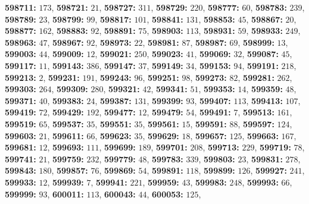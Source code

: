 \textsf{\bfseries 598711:} $173$, \textsf{\bfseries 598721:} $21$, \textsf{\bfseries 598727:} $311$, \textsf{\bfseries 598729:} $220$, \textsf{\bfseries 598777:} $60$, \textsf{\bfseries 598783:} $239$, \textsf{\bfseries 598789:} $23$, \textsf{\bfseries 598799:} $99$, \textsf{\bfseries 598817:} $101$, \textsf{\bfseries 598841:} $131$, \textsf{\bfseries 598853:} $45$, \textsf{\bfseries 598867:} $20$, \textsf{\bfseries 598877:} $162$, \textsf{\bfseries 598883:} $92$, \textsf{\bfseries 598891:} $75$, \textsf{\bfseries 598903:} $113$, \textsf{\bfseries 598931:} $59$, \textsf{\bfseries 598933:} $249$, \textsf{\bfseries 598963:} $47$, \textsf{\bfseries 598967:} $92$, \textsf{\bfseries 598973:} $22$, \textsf{\bfseries 598981:} $87$, \textsf{\bfseries 598987:} $69$, \textsf{\bfseries 598999:} $13$, \textsf{\bfseries 599003:} $44$, \textsf{\bfseries 599009:} $12$, \textsf{\bfseries 599021:} $250$, \textsf{\bfseries 599023:} $41$, \textsf{\bfseries 599069:} $32$, \textsf{\bfseries 599087:} $45$, \textsf{\bfseries 599117:} $11$, \textsf{\bfseries 599143:} $386$, \textsf{\bfseries 599147:} $37$, \textsf{\bfseries 599149:} $34$, \textsf{\bfseries 599153:} $94$, \textsf{\bfseries 599191:} $218$, \textsf{\bfseries 599213:} $2$, \textsf{\bfseries 599231:} $191$, \textsf{\bfseries 599243:} $96$, \textsf{\bfseries 599251:} $98$, \textsf{\bfseries 599273:} $82$, \textsf{\bfseries 599281:} $262$, \textsf{\bfseries 599303:} $264$, \textsf{\bfseries 599309:} $280$, \textsf{\bfseries 599321:} $42$, \textsf{\bfseries 599341:} $51$, \textsf{\bfseries 599353:} $14$, \textsf{\bfseries 599359:} $48$, \textsf{\bfseries 599371:} $40$, \textsf{\bfseries 599383:} $24$, \textsf{\bfseries 599387:} $131$, \textsf{\bfseries 599399:} $93$, \textsf{\bfseries 599407:} $113$, \textsf{\bfseries 599413:} $107$, \textsf{\bfseries 599419:} $72$, \textsf{\bfseries 599429:} $192$, \textsf{\bfseries 599477:} $12$, \textsf{\bfseries 599479:} $54$, \textsf{\bfseries 599491:} $7$, \textsf{\bfseries 599513:} $161$, \textsf{\bfseries 599519:} $65$, \textsf{\bfseries 599537:} $35$, \textsf{\bfseries 599551:} $35$, \textsf{\bfseries 599561:} $15$, \textsf{\bfseries 599591:} $88$, \textsf{\bfseries 599597:} $124$, \textsf{\bfseries 599603:} $21$, \textsf{\bfseries 599611:} $66$, \textsf{\bfseries 599623:} $35$, \textsf{\bfseries 599629:} $18$, \textsf{\bfseries 599657:} $125$, \textsf{\bfseries 599663:} $167$, \textsf{\bfseries 599681:} $12$, \textsf{\bfseries 599693:} $111$, \textsf{\bfseries 599699:} $189$, \textsf{\bfseries 599701:} $208$, \textsf{\bfseries 599713:} $229$, \textsf{\bfseries 599719:} $78$, \textsf{\bfseries 599741:} $21$, \textsf{\bfseries 599759:} $232$, \textsf{\bfseries 599779:} $48$, \textsf{\bfseries 599783:} $339$, \textsf{\bfseries 599803:} $23$, \textsf{\bfseries 599831:} $278$, \textsf{\bfseries 599843:} $180$, \textsf{\bfseries 599857:} $76$, \textsf{\bfseries 599869:} $54$, \textsf{\bfseries 599891:} $118$, \textsf{\bfseries 599899:} $126$, \textsf{\bfseries 599927:} $241$, \textsf{\bfseries 599933:} $12$, \textsf{\bfseries 599939:} $7$, \textsf{\bfseries 599941:} $221$, \textsf{\bfseries 599959:} $43$, \textsf{\bfseries 599983:} $248$, \textsf{\bfseries 599993:} $66$, \textsf{\bfseries 599999:} $93$, \textsf{\bfseries 600011:} $113$, \textsf{\bfseries 600043:} $44$, \textsf{\bfseries 600053:} $125$, 
